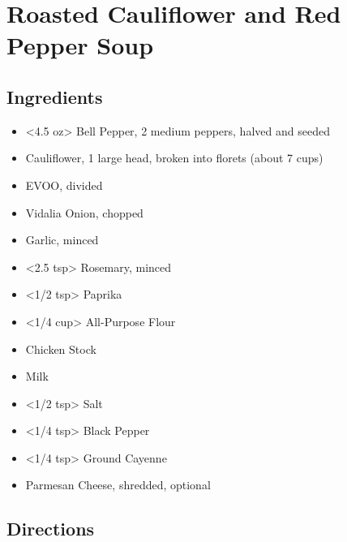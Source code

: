 \section{Roasted Cauliflower and Red Pepper Soup}

\subsection{ Ingredients }

\begin{itemize}
  \item <4.5 oz> Bell Pepper, 2 medium peppers, halved and seeded
  \item <19 oz> Cauliflower, 1 large head, broken into florets (about 7 cups)
  \item <4 tbs> EVOO, divided
  \item <1 cup> Vidalia Onion, chopped
  \item <2 cloves> Garlic, minced
  \item <2.5 tsp> Rosemary, minced
  \item <1/2 tsp> Paprika
  \item <1/4 cup> All-Purpose Flour
  \item <4 cups> Chicken Stock
  \item <1 cup> Milk
  \item <1/2 tsp> Salt
  \item <1/4 tsp> Black Pepper
  \item <1/4 tsp> Ground Cayenne
  \item <5 g> Parmesan Cheese, shredded, optional
\end{itemize}

\subsection{ Directions }

